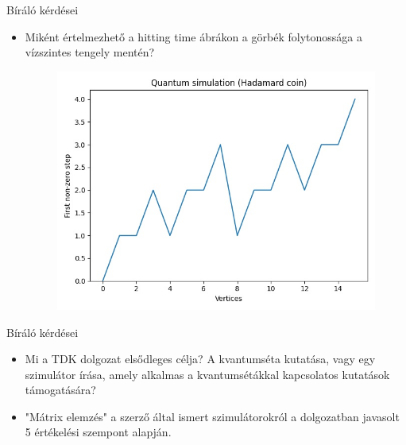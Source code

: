 \documentclass[aspectratio=169]{beamer}
\begin{document}
\begin{frame}{Bíráló kérdései}

\begin{itemize}
    \item Miként értelmezhető a hitting time ábrákon a görbék folytonossága a vízszintes tengely mentén?
     \begin{figure}[H]
        \includegraphics[width=0.6\linewidth]{./tdk_figures/results/hypercube/hadamard_hitting_time.jpg}
      \end{figure}
\end{itemize}

\end{frame}


\begin{frame}{Bíráló kérdései}

\begin{itemize}
    \item Mi a TDK dolgozat elsődleges célja? A kvantumséta kutatása, vagy egy szimulátor írása, amely alkalmas a kvantumsétákkal kapcsolatos kutatások támogatására?
    \item "Mátrix elemzés" a szerző által ismert szimulátorokról a dolgozatban javasolt 5 értékelési szempont alapján.
\end{itemize}

\end{frame}
\end{document}
